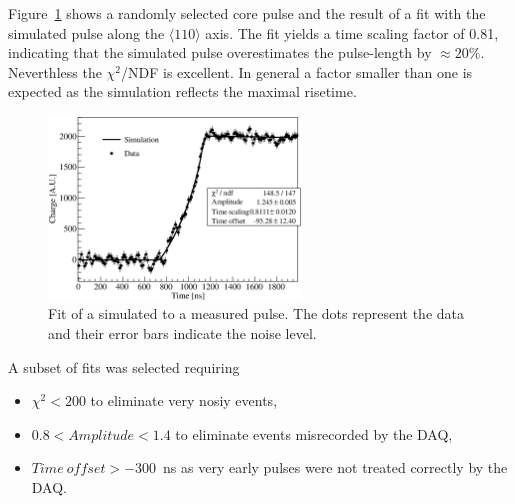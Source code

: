 Figure~\ref{fig:psa:s2d} shows a randomly selected core pulse and the result of a fit with the simulated pulse along the $\langle 110 \rangle$ axis. The fit yields a time scaling factor of 0.81, indicating that the simulated pulse overestimates the pulse-length by $\approx 20\%$. Neverthless the $\chi^{2}$/NDF is excellent. In general a factor smaller than one is expected as the simulation reflects the maximal risetime.
\begin{figure}[htbp]
\centering
\includegraphics[width=0.6\textwidth]{PSs2d}
\caption{Fit of a simulated to a measured pulse. The dots represent the data and their error bars indicate the noise level.}
\label{fig:psa:s2d}
\end{figure}

A subset of fits was selected requiring
\begin{itemize}
\item $\chi^{2} < 200$ to eliminate very nosiy events,
\item $0.8 < Amplitude < 1.4$ to eliminate events misrecorded by the DAQ,
\item $Time\ offset > -300$~ns as very early pulses were not treated correctly by the DAQ.
\end{itemize}

